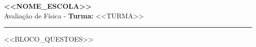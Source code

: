 \documentclass[12pt, a4paper]{article}
\begin{document}
\begin{center}
    \Large\textbf{<<NOME_ESCOLA>>} \\
    \vspace{0.2cm}
    \large Avaliação de Física - \textbf{Turma:} <<TURMA>>
\end{center}
\hrule
\vspace{1cm}

<<BLOCO_QUESTOES>>
\end{document}
